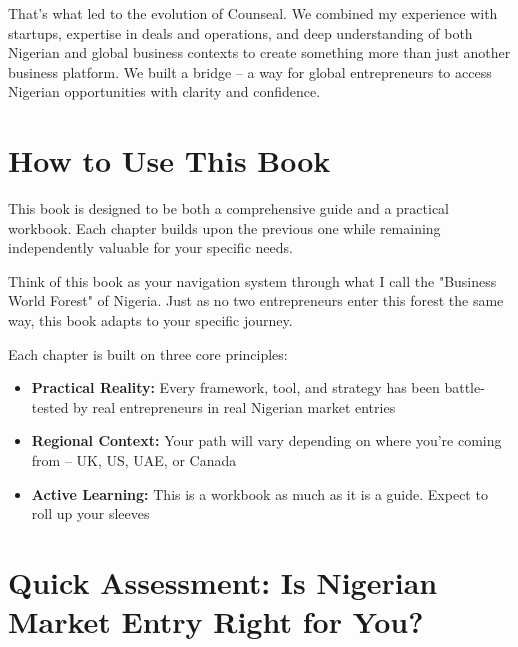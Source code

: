 That's what led to the evolution of Counseal. We combined my experience with startups, expertise in deals and operations, and deep understanding of both Nigerian and global business contexts to create something more than just another business platform. We built a bridge – a way for global entrepreneurs to access Nigerian opportunities with clarity and confidence.

\section{How to Use This Book}

\begin{importantbox}
This book is designed to be both a comprehensive guide and a practical workbook. Each chapter builds upon the previous one while remaining independently valuable for your specific needs.
\end{importantbox}

Think of this book as your navigation system through what I call the "Business World Forest" of Nigeria. Just as no two entrepreneurs enter this forest the same way, this book adapts to your specific journey.

Each chapter is built on three core principles:
\begin{itemize}
    \item \textbf{Practical Reality:} Every framework, tool, and strategy has been battle-tested by real entrepreneurs in real Nigerian market entries
    \item \textbf{Regional Context:} Your path will vary depending on where you're coming from – UK, US, UAE, or Canada
    \item \textbf{Active Learning:} This is a workbook as much as it is a guide. Expect to roll up your sleeves
\end{itemize}

\section{Quick Assessment: Is Nigerian Market Entry Right for You?}

